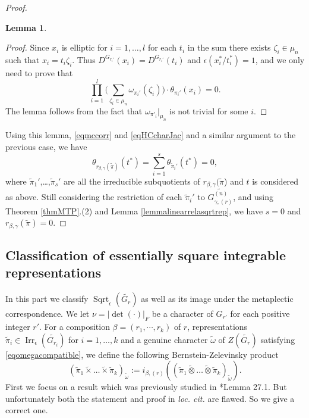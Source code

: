 \documentclass{amsart}
\numberwithin{equation}{section}
\newtheorem{lemma}[theorem]{\bf{Lemma}}
\newcommand{\abs}[1]{\left|#1\right|_{F}}
\newcommand{\rest}{\lvert}
\newcommand{\mrdet}{\operatorname{det}}
\newcommand{\mrirr}{\operatorname{Irr}}
\newcommand{\mrsqrt}{\operatorname{Sqrt}}
\newcommand{\wt}[1]{\widetilde{#1}}
\begin{document}
\begin{proof}
\begin{lemma}
		\end{lemma}
		
		\begin{proof}
			
			Since $x_{i}$ is elliptic for $i=1,\dots,l$ for each $t_{i}$ in the sum there exists $\zeta_{i}\in\mu_{n}$ such that $x_{i}=t_{i}\zeta_{i}$. Thus $D^{G_{r_{i}'}}(x_{i})=D^{G_{r_{i}'}}(t_{i})$ and $\epsilon(x_{i}^{*}/t_{i}^{*})=1$, and we only need to prove that
			$$\prod_{i=1}^{l}\bigg(\sum_{\zeta_{i}\in\mu_{n}}\omega_{\pi_{i}'}(\zeta_{i})\bigg)\cdot\theta_{\pi_{i}'}(x_{i})=0.$$
			The lemma follows from the fact that $\omega_{\pi'_{i}}\rest_{\mu_{n}}$ is not trivial for some $i$.	
			
		\end{proof}
		
		Using this lemma, \eqref{eqmccorr} and \eqref{eqHCcharJac} and a similar argument to the previous case, we have \begin{equation}
			\theta_{r_{\beta,\gamma}(\wt{\pi})}(t^{*})=\sum_{i=1}^{s}\theta_{\wt{\pi}_{i}'}(t^{*})=0,
		\end{equation}
		where $\wt{\pi}_{1}'$,\dots,$\wt{\pi}_{s}'$ are all the irreducible subquotients of $r_{\beta,\gamma}(\wt{\pi}$) and $t$ is considered as above. Still considering the restriction of each $\wt{\pi}_{i}'$ to $\wt{G_{\gamma,(r)}^{(n)}}$, and using Theorem \ref{thmMTP}.(2) and Lemma \ref{lemmalinearrelasqrtrep}, we have $s=0$ and $r_{\beta,\gamma}(\wt{\pi})=0$.
		
	\end{proof}
	
	\subsection{Classification of essentially square integrable representations}
	
	In this part we classify $\mrsqrt_{\epsilon}(\wt{G_{r}})$ as well as its image under the metaplectic correspondence.
	We let $\nu=\abs{\mrdet(\cdot)}$ be a character of $G_{r'}$ for each positive integer $r'$. For a composition  $\beta=(r_{1},\cdots,r_{k})$ of $r$, representations $\wt{\pi}_{i}\in\mrirr_{\epsilon}(\wt{G_{r_{i}}})$ for $i=1,\dots, k$ and a genuine character $\wt{\omega}$ of $Z(\wt{G_{r}})$ satisfying \eqref{eqomegacompatible}, we define the following Bernstein-Zelevinsky product 
	$$(\wt{\pi}_{1}\wt{\times}\dots\wt{\times}\wt{\pi}_{k})_{\wt{\omega}}:=i_{\beta,(r)}((\wt{\pi}_{1}\wt{\otimes}\dots\wt{\otimes}\wt{\pi}_{k})_{\wt{\omega}}).$$ 
	First we focus on a result which was previously studied in \cite{flicker1986metaplectic}*{Lemma 27.1}. But unfortunately both the statement and proof in \emph{loc. cit.} are flawed. So we give a correct one.
	
\end{document}
